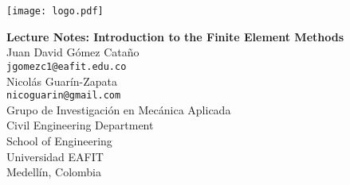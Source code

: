 \graphicspath{ {./img/} }
%
\begin{center}
\texttt{[image: logo.pdf]}\par

\Large{\textbf{Lecture Notes: Introduction to the Finite Element Methods}}
\large
\\[30mm]
Juan David Gómez Cataño\\
\texttt{jgomezc1@eafit.edu.co}\\
Nicolás Guarín-Zapata\\
\texttt{nicoguarin@gmail.com}
\\[20mm]
Grupo de Investigación en Mecánica Aplicada
\\
Civil Engineering Department
\\
School of Engineering
\\
Universidad EAFIT
\\
Medellín, Colombia
\\
\the\year
\end{center}
\thispagestyle{empty}